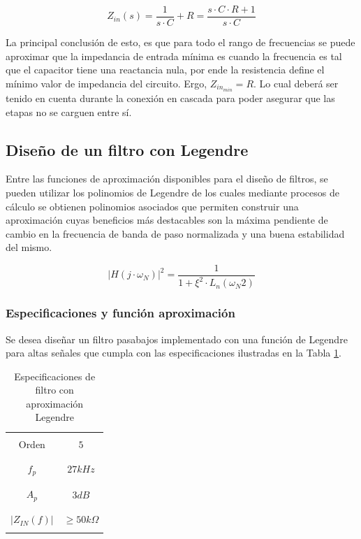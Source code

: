\begin{equation}
    Z_{in}(s) = \frac{1}{s \cdot C} + R = \frac{s \cdot C \cdot R + 1}{s \cdot C}
    \label{eq:impedancia_entrada_primer_orden}
\end{equation}

La principal conclusi\'on de esto, es que para todo el rango de frecuencias se puede aproximar que la impedancia de entrada m\'inima es cuando la frecuencia es tal que el capacitor
tiene una reactancia nula, por ende la resistencia define el m\'inimo valor de impedancia del circuito. Ergo, $Z_{in_{min}} = R$. Lo cual deber\'a ser tenido en cuenta durante la conexi\'on
en cascada para poder asegurar que las etapas no se carguen entre s\'i.

\subsection{Dise\~no de un filtro con Legendre}
Entre las funciones de aproximaci\'on disponibles para el dise\~no de filtros, se pueden utilizar los polinomios de Legendre de los cuales
mediante procesos de c\'alculo se obtienen polinomios asociados que permiten construir una aproximaci\'on cuyas beneficios m\'as destacables son la m\'axima pendiente
de cambio en la frecuencia de banda de paso normalizada y una buena estabilidad del mismo.

\begin{equation}
    |H(j \cdot \omega_N)|^{2} = \frac{1}{1 + \xi^{2} \cdot L_n(\omega_N{2})}
\end{equation}

\subsubsection{Especificaciones y funci\'on aproximaci\'on}
Se desea dise\~nar un filtro pasabajos implementado con una funci\'on de Legendre para altas se\~nales que cumpla con las especificaciones
ilustradas en la Tabla \ref{table:especificaciones_legendre}.

\begin{table}[H]
    \centering
    \begin{tabular}{c | c}
        \hline \\
        Orden & $5$ \\
        \\ \hline \\
        $f_p$ & $27kHz$ \\
        \\ \hline \\
        $A_p$ & $3 dB$ \\
        \\ \hline \\
        $|Z_{IN}(f)|$ & $\geq 50k \Omega$ \\ 
        \\ \hline
    \end{tabular}
    \caption{Especificaciones de filtro con aproximaci\'on Legendre}
    \label{table:especificaciones_legendre}
\end{table}

